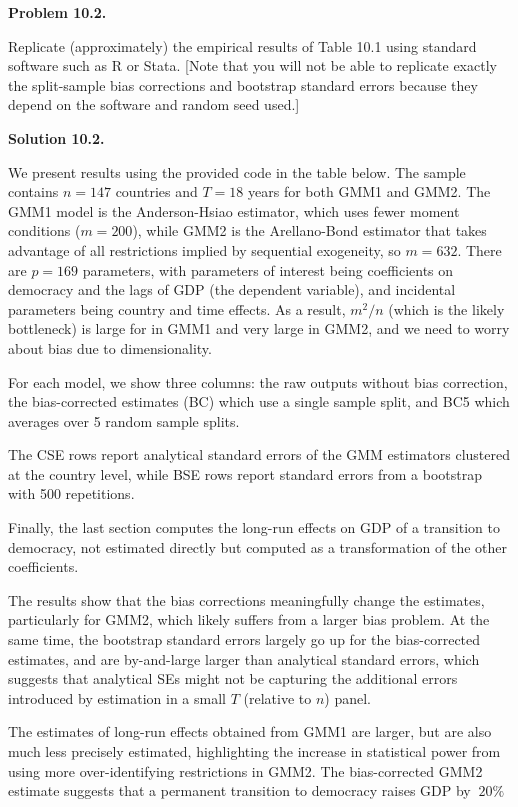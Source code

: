 \documentclass[11pt]{article}
\newenvironment{problem}[1]
    {\bigskip\noindent\textbf{Problem #1.}\par\setlength{\parindent}{0pt}}
    {\medskip}
\newenvironment{solution}[1]
    {\bigskip\noindent\textbf{Solution #1.} \par}
    {\medskip}
\begin{document}
\begin{problem}{10.2}
Replicate (approximately) the empirical results of Table 10.1
using standard software such as R or Stata. [Note that you
will not be able to replicate exactly the split-sample bias corrections
and bootstrap standard errors because they depend
on the software and random seed used.]
\end{problem}

\begin{solution}{10.2}
We present results using the provided code in the table below. The sample contains $n=147$ countries and $T=18$ years for both GMM1 and GMM2. The GMM1 model is the Anderson-Hsiao estimator, which uses fewer moment conditions ($m=200$), while GMM2 is the Arellano-Bond estimator that takes advantage of all restrictions implied by sequential exogeneity, so $m=632$. There are $p=169$ parameters, with parameters of interest being coefficients on democracy and the lags of GDP (the dependent variable), and incidental parameters being country and time effects. As a result, $m^2/n$ (which is the likely bottleneck) is large for in GMM1 and very large in GMM2, and we need to worry about bias due to dimensionality.

For each model, we show three columns: the raw outputs without bias correction, the bias-corrected estimates (BC) which use a single sample split, and BC5 which averages over 5 random sample splits.

The CSE rows report analytical standard errors of the GMM estimators clustered at the country level, while BSE rows report standard errors from a bootstrap with 500 repetitions.

Finally, the last section computes the long-run effects on GDP of a transition to democracy, not estimated directly but computed as a transformation of the other coefficients.

\begin{center}
    
\end{center}

The results show that the bias corrections meaningfully change the estimates, particularly for GMM2, which likely suffers from a larger bias problem. At the same time, the bootstrap standard errors largely go up for the bias-corrected estimates, and are by-and-large larger than analytical standard errors, which suggests that analytical SEs might not be capturing the additional errors introduced by estimation in a small $T$ (relative to $n$) panel.

The estimates of long-run effects obtained from GMM1 are larger, but are also much less precisely estimated, highlighting the increase in statistical power from using more over-identifying restrictions in GMM2. The bias-corrected GMM2 estimate suggests that a permanent transition to democracy raises GDP by $~20\%$

\end{solution}
\end{document}

